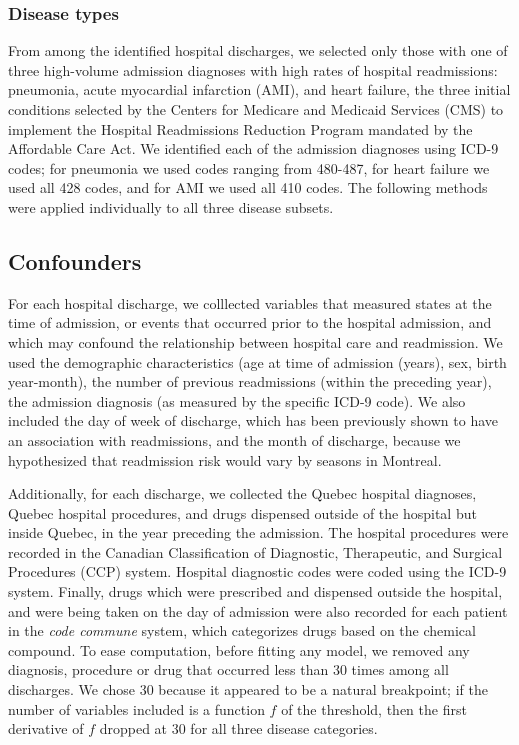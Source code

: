\documentclass[]{article}\usepackage[]{graphicx}\usepackage[]{color}
\begin{document}
\subsubsection{Disease types}
From among the identified hospital discharges, we selected only those with one of three high-volume admission diagnoses with high rates of hospital readmissions: pneumonia, acute myocardial infarction (AMI), and heart failure, the three initial conditions selected by the Centers for Medicare and Medicaid Services (CMS) to implement the Hospital Readmissions Reduction Program mandated by the Affordable Care Act. We identified each of the admission diagnoses using ICD-9 codes; for pneumonia we used codes ranging from 480-487, for heart failure we used all 428 codes, and for AMI we used all 410 codes. The following methods were applied individually to all three disease subsets. 


\subsection{Confounders}
For each hospital discharge, we colllected variables that measured states at the time of admission, or events that occurred prior to the hospital admission, and which may confound the relationship between hospital care and readmission. We used the demographic characteristics (age at time of admission (years), sex, birth year-month), the number of previous readmissions (within the preceding year), the admission diagnosis (as measured by the specific ICD-9 code). We also included the day of week of discharge, which has been previously shown to have an association with readmissions\supercite{}, and the month of discharge, because we hypothesized that readmission risk would vary by seasons in Montreal.

Additionally, for each discharge, we collected the Quebec hospital diagnoses, Quebec hospital procedures, and drugs dispensed outside of the hospital but inside Quebec, in the year preceding the admission. The hospital procedures were recorded in the Canadian Classification of Diagnostic, Therapeutic, and Surgical Procedures (CCP) system. Hospital diagnostic codes were coded using the ICD-9 system. Finally, drugs which were prescribed and dispensed outside the hospital, and were being taken on the day of admission were also recorded for each patient in the \emph{code commune} system, which categorizes drugs based on the chemical compound. To ease computation, before fitting any model, we removed any diagnosis, procedure or drug that occurred less than 30 times among all discharges. We chose 30 because it appeared to be a natural breakpoint; if the number of variables included is a function $f$ of the threshold, then the first derivative of $f$ dropped at 30 for all three disease categories.
\end{document}
